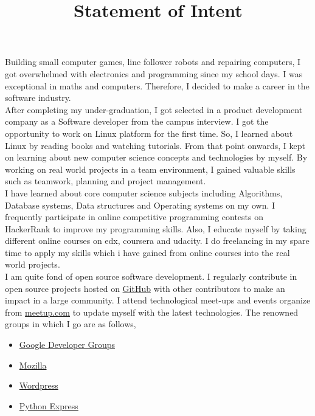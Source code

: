 \documentclass{article}
\title{Statement of Intent}
\author{}
\begin{document}
  \maketitle %

Building small computer games, line follower robots and repairing computers, I got overwhelmed with electronics and programming since my school days. I was exceptional in maths and computers. Therefore, I decided to make a career in the software industry.\\

After completing my under-graduation, I got selected in a product development company as a Software developer from the campus interview. I got the opportunity to work on Linux platform for the first time. So, I learned about Linux by reading books and watching tutorials. From that point onwards, I kept on learning about new computer science concepts and technologies by myself. By working on real world projects in a team environment, I gained valuable skills such as teamwork, planning and project management.\\

I have learned about core computer science subjects including Algorithms, Database systems, Data structures and Operating systems on my own. I frequently participate in online competitive programming contests on HackerRank to improve my programming skills. Also, I educate myself by taking different online courses on edx, coursera and udacity. I do freelancing in my spare time to apply my skills which i have gained from online courses into the real world projects.\\

I am quite fond of open source software development. I regularly contribute in open source projects hosted on \href{http://www.GitHub.com/mehul-m-prajapati}{GitHub} with other contributors to make an impact in a large community. I attend technological meet-ups and events organize from \href{www.meetup.com}{meetup.com} to update myself with the latest technologies. The renowned groups in which I go are as follows,

\begin{itemize}
   \item \href{https://developers.google.com/groups/chapter/106261089114347152720/}{Google Developer Groups}
   
   \item \href{http://mozillaindia.org/}{Mozilla} 
   
   \item \href{https://www.meetup.com/ahmedabad-wp-meetup/members/72560962/}{Wordpress}
   
   \item \href{https://pythonexpress.in/}{Python Express}
\end{itemize}
\end{document}
